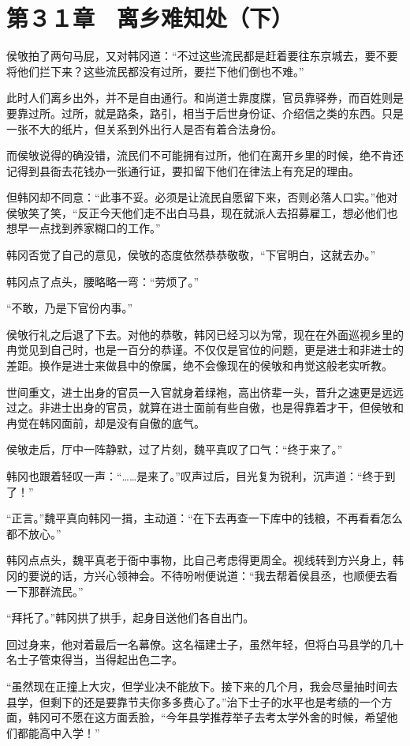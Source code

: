 \section{第３１章　离乡难知处（下）}

侯敂拍了两句马屁，又对韩冈道：“不过这些流民都是赶着要往东京城去，要不要将他们拦下来？这些流民都没有过所，要拦下他们倒也不难。”

此时人们离乡出外，并不是自由通行。和尚道士靠度牒，官员靠驿券，而百姓则是要靠过所。过所，就是路条，路引，相当于后世身份证、介绍信之类的东西。只是一张不大的纸片，但关系到外出行人是否有着合法身份。

而侯敂说得的确没错，流民们不可能拥有过所，他们在离开乡里的时候，绝不肯还记得到县衙去花钱办一张通行证，要扣留下他们在律法上有充足的理由。

但韩冈却不同意：“此事不妥。必须是让流民自愿留下来，否则必落人口实。”他对侯敂笑了笑，“反正今天他们走不出白马县，现在就派人去招募雇工，想必他们也想早一点找到养家糊口的工作。”

韩冈否觉了自己的意见，侯敂的态度依然恭恭敬敬，“下官明白，这就去办。”

韩冈点了点头，腰略略一弯：“劳烦了。”

“不敢，乃是下官份内事。”

侯敂行礼之后退了下去。对他的恭敬，韩冈已经习以为常，现在在外面巡视乡里的冉觉见到自己时，也是一百分的恭谨。不仅仅是官位的问题，更是进士和非进士的差距。换作是进士来做县中的僚属，绝不会像现在的侯敂和冉觉这般老实听教。

世间重文，进士出身的官员一入官就身着绿袍，高出侪辈一头，晋升之速更是远远过之。非进士出身的官员，就算在进士面前有些自傲，也是得靠着才干，但侯敂和冉觉在韩冈面前，却是没有自傲的底气。

侯敂走后，厅中一阵静默，过了片刻，魏平真叹了口气：“终于来了。”

韩冈也跟着轻叹一声：“……是来了。”叹声过后，目光复为锐利，沉声道：“终于到了！”

“正言。”魏平真向韩冈一揖，主动道：“在下去再查一下库中的钱粮，不再看看怎么都不放心。”

韩冈点点头，魏平真老于衙中事物，比自己考虑得更周全。视线转到方兴身上，韩冈的要说的话，方兴心领神会。不待吩咐便说道：“我去帮着侯县丞，也顺便去看一下那群流民。”

“拜托了。”韩冈拱了拱手，起身目送他们各自出门。

回过身来，他对着最后一名幕僚。这名福建士子，虽然年轻，但将白马县学的几十名士子管束得当，当得起出色二字。

“虽然现在正撞上大灾，但学业决不能放下。接下来的几个月，我会尽量抽时间去县学，但剩下的还是要靠节夫你多多费心了。”治下士子的水平也是考绩的一个方面，韩冈可不愿在这方面丢脸，“今年县学推荐举子去考太学外舍的时候，希望他们都能高中入学！”

